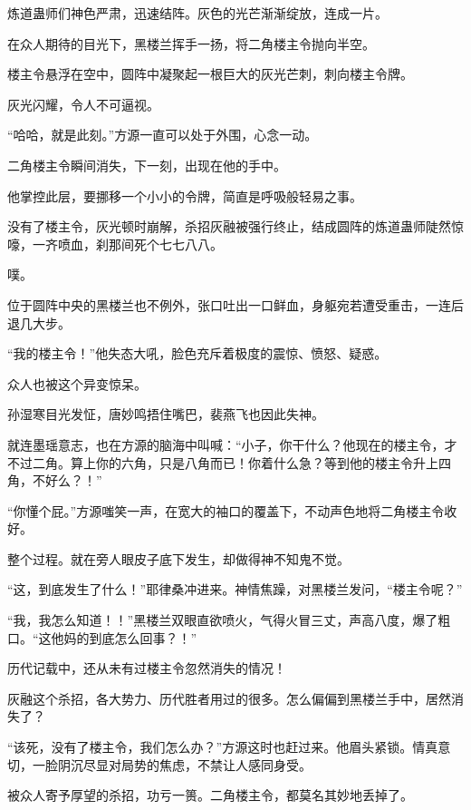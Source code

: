 
\begin{this_body}

炼道蛊师们神色严肃，迅速结阵。灰色的光芒渐渐绽放，连成一片。

在众人期待的目光下，黑楼兰挥手一扬，将二角楼主令抛向半空。

楼主令悬浮在空中，圆阵中凝聚起一根巨大的灰光芒刺，刺向楼主令牌。

灰光闪耀，令人不可逼视。

“哈哈，就是此刻。”方源一直可以处于外围，心念一动。

二角楼主令瞬间消失，下一刻，出现在他的手中。

他掌控此层，要挪移一个小小的令牌，简直是呼吸般轻易之事。

没有了楼主令，灰光顿时崩解，杀招灰融被强行终止，结成圆阵的炼道蛊师陡然惊嚎，一齐喷血，刹那间死个七七八八。

噗。

位于圆阵中央的黑楼兰也不例外，张口吐出一口鲜血，身躯宛若遭受重击，一连后退几大步。

“我的楼主令！”他失态大吼，脸色充斥着极度的震惊、愤怒、疑惑。

众人也被这个异变惊呆。

孙湿寒目光发怔，唐妙鸣捂住嘴巴，裴燕飞也因此失神。

就连墨瑶意志，也在方源的脑海中叫喊：“小子，你干什么？他现在的楼主令，才不过二角。算上你的六角，只是八角而已！你着什么急？等到他的楼主令升上四角，不好么？！”

“你懂个屁。”方源嗤笑一声，在宽大的袖口的覆盖下，不动声色地将二角楼主令收好。

整个过程。就在旁人眼皮子底下发生，却做得神不知鬼不觉。

“这，到底发生了什么！”耶律桑冲进来。神情焦躁，对黑楼兰发问，“楼主令呢？”

“我，我怎么知道！！”黑楼兰双眼直欲喷火，气得火冒三丈，声高八度，爆了粗口。“这他妈的到底怎么回事？！”

历代记载中，还从未有过楼主令忽然消失的情况！

灰融这个杀招，各大势力、历代胜者用过的很多。怎么偏偏到黑楼兰手中，居然消失了？

“该死，没有了楼主令，我们怎么办？”方源这时也赶过来。他眉头紧锁。情真意切，一脸阴沉尽显对局势的焦虑，不禁让人感同身受。

被众人寄予厚望的杀招，功亏一篑。二角楼主令，都莫名其妙地丢掉了。


\end{this_body}
